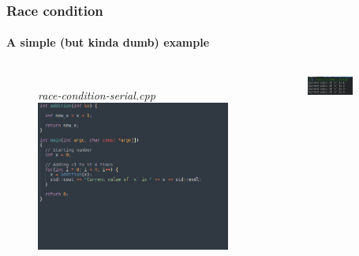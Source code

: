 \begin{frame}
\frametitle{Race condition}
\framesubtitle{A simple (but kinda dumb) example}

\begin{columns}
	\begin{figure}
		{\centering\small\textit{race-condition-serial.cpp}}
		\includegraphics[width=\textwidth]{img/race-cond-ser.png}	
	\end{figure}
	\vspace*{-15pt}
	\begin{figure}
		\includegraphics[width=0.7\textwidth]{img/race-cond-ser-output.png}
	\end{figure}
	

\end{columns}
\end{frame}

